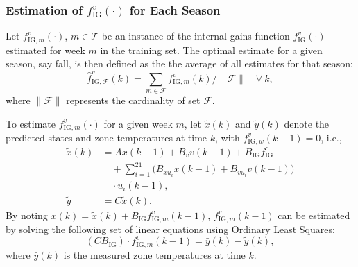 \subsubsection{Estimation of $f_\text{IG}^v(\cdot)$ for Each Season}
Let $f_{\text{IG},m}^v(\cdot)$, $m \in \mathcal{T}$ be an instance of the internal gains function $f_{\text{IG}}^v(\cdot)$ estimated for week $m$ in the training set. 
The optimal estimate for a given season, say fall, is then defined as the the average of all estimates for that season:
\begin{equation}
\hat {f}_{\text{IG},\mathcal{F}}^v(k) = \textstyle \sum_{m \in \mathcal{F}} f^v_{\text{IG},m}(k) / \| \mathcal{F} \| \quad \forall~k,
\end{equation}
where $\| \mathcal{F} \| $ represents the cardinality of set $\mathcal{F}$.

To estimate $f_{\text{IG},m}^v(\cdot)$ for a given week $m$, let $\tilde x(k)$ and $\tilde{y}(k)$ denote the predicted states and zone temperatures at time $k$, with $f_{\text{IG},w}^v(k-1) = 0$, i.e.,
\begin{equation}\label{Eq:xnoig_ynoig}
	\begin{aligned}
	\tilde x(k) & = Ax(k-1)+B_v v(k-1) + B_\text{IG} f^c_\text{IG} \\
		& \quad + \textstyle \sum_{i=1}^{21} \big( B_{xu_i} x(k-1) + B_{vu_i} v(k-1) \big) \\
		& \quad \cdot u_{i}(k-1), \\
	\tilde y & = C \tilde x(k).
	\end{aligned}
\end{equation} 
By noting $x(k) = \tilde{x}(k) + B_\text{IG} f^v_{\text{IG},m}(k-1)$, $f^v_{\text{IG},m}(k-1)$ can be estimated by solving the following set of linear equations using Ordinary Least Squares:
\begin{equation}\label{Eq:ig(k-1)}
(C B_\text{IG}) \cdot f_{\text{IG},m}^v(k-1) = \bar{y}(k) - \tilde{y}(k),
\end{equation}
where $\bar{y}(k)$ is the measured zone temperatures at time $k$.  

